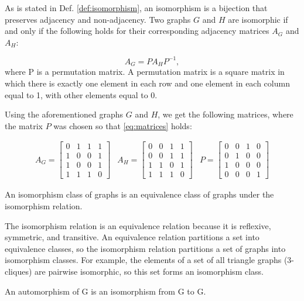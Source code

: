 As is stated in Def. \ref{def:isomorphism}, an isomorphism is a bijection that preserves adjacency and non-adjacency. Two graphs $G$ and $H$ are isomorphic if and only if the following holds for their corresponding adjacency matrices $A_G$ and $A_H$:

\begin{equation}
\label{eq:matrices}
A_G = P A_H P^{-1},
\end{equation}
where P is a permutation matrix. A permutation matrix is a square matrix in which there is exactly one element in each row and one element in each column equal to 1, with other elements equal to 0.

Using the aforementioned graphs $G$ and $H$, we get the following matrices, where the matrix $P$ was chosen so that \ref{eq:matrices} holds:

\[
\begin{aligned}
A_G =
\begin{bmatrix}
0&1&1&1\\
1&0&0&1\\
1&0&0&1\\
1&1&1&0
\end{bmatrix}
&
A_H =
\begin{bmatrix}
0&0&1&1\\
0&0&1&1\\
1&1&0&1\\
1&1&1&0
\end{bmatrix}
&
P =
\begin{bmatrix}
0&0&1&0\\
0&1&0&0\\
1&0&0&0\\
0&0&0&1
\end{bmatrix}
\end{aligned}
\]

\begin{definition}
\label{def:isomorphism_class}
An isomorphism class of graphs is an equivalence class of graphs under the isomorphism relation.
\end{definition}

The isomorphism relation is an equivalence relation because it is reflexive, symmetric, and transitive. An equivalence relation partitions a set into equivalence classes, so the isomorphism relation partitions a set of graphs into isomorphism classes. For example, the elements of a set of all triangle graphs (3-cliques) are pairwise isomorphic, so this set forms an isomorphism class.

\begin{definition}
\label{def:automorhism}
An automorphism of G is an isomorphism from G to G.
\end{definition}

